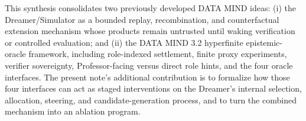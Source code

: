 \documentclass[11pt]{article}
\begin{document}
This synthesis consolidates two previously developed DATA MIND ideas: (i) the Dreamer/Simulator as a bounded replay, recombination, and counterfactual extension mechanism whose products remain untrusted until waking verification or controlled evaluation; and (ii) the DATA MIND 3.2 hyperfinite epistemic-oracle framework, including role-indexed settlement, finite proxy experiments, verifier sovereignty, Professor-facing versus direct role hints, and the four oracle interfaces. The present note's additional contribution is to formalize how those four interfaces can act as staged interventions on the Dreamer's internal selection, allocation, steering, and candidate-generation process, and to turn the combined mechanism into an ablation program.
\end{document}
